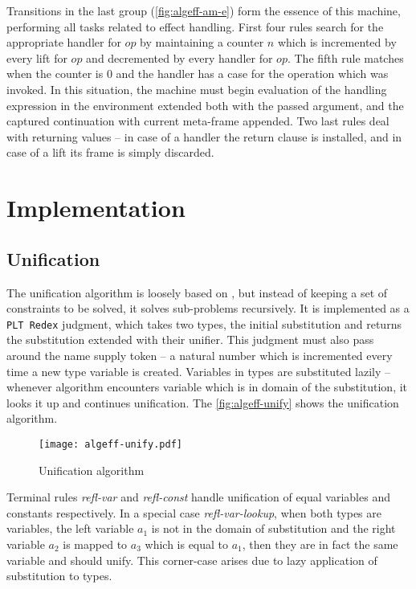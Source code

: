 \documentclass[inz, english, shortabstract]{iithesis}
\newcommand{\Redex}{\texttt{PLT Redex}}
\begin{document}
Transitions in the last group (\autoref{fig:algeff-am-e}) form the essence of this machine, performing all tasks related to effect handling.
First four rules search for the appropriate handler for $ op $ by maintaining a counter $ n $ which is incremented by every lift for $ op $ and decremented by every handler for $ op $.
The fifth rule matches when the counter is $ 0 $ and the handler has a case for the operation which was invoked. 
In this situation, the machine must begin evaluation of the handling expression in the environment extended both with the passed argument, and the captured continuation with current meta-frame appended.
Two last rules deal with returning values -- in case of a handler the return clause is installed, and in case of a lift its frame is simply discarded.

\chapter{Implementation}\label{ch:implementation}
\section{Unification}\label{sec:unification}
The unification algorithm is loosely based on \cite{Pierce2002}, but instead of keeping a set of constraints to be solved, it solves sub-problems recursively.
It is implemented as a \Redex{} judgment, which takes two types, the initial substitution and returns the substitution extended with their unifier.
This judgment must also pass around the name supply token -- a natural number which is incremented every time a new type variable is created.
Variables in types are substituted lazily -- whenever algorithm encounters variable which is in domain of the substitution, it looks it up and continues unification.
The \autoref{fig:algeff-unify} shows the unification algorithm.

\begin{figure}[h]
  \centering
  \texttt{[image: algeff-unify.pdf]}
  \caption{Unification algorithm}
  \label{fig:algeff-unify}
\end{figure}

Terminal rules \emph{refl-var} and \emph{refl-const} handle unification of equal variables and constants respectively.
In a special case \emph{refl-var-lookup}, when both types are variables, the left variable $a_1$ is not in the domain of substitution and the right variable $a_2$ is mapped to $a_3$ which is equal to $a_1$, then they are in fact the same variable and should unify.
This corner-case arises due to lazy application of substitution to types.
\end{document}
